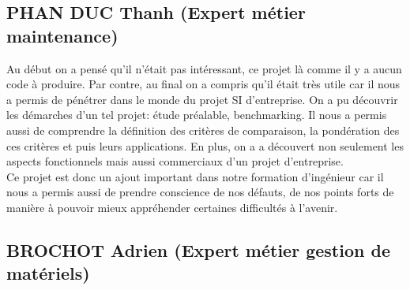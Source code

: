        \subsection{PHAN DUC Thanh (Expert métier maintenance)}

Au début on a pensé qu'il n'était pas intéressant, ce projet là comme il y a aucun code à produire. Par  contre, au final on a compris qu'il était très utile car il nous a permis de pénétrer dans le monde du projet SI d'entreprise. On a pu découvrir les démarches d'un tel projet: étude préalable, benchmarking. Il nous a permis aussi de comprendre la définition des critères de comparaison, la pondération des ces critères et puis leurs applications.  En plus, on a a découvert non seulement les aspects fonctionnels mais aussi commerciaux d'un projet d'entreprise.\\

Ce projet est donc un ajout important dans notre formation d'ingénieur car il nous a permis aussi de prendre conscience de nos défauts, de nos points forts de manière à pouvoir mieux appréhender certaines difficultés à l'avenir. 

       \subsection{BROCHOT Adrien (Expert métier gestion de matériels)}

